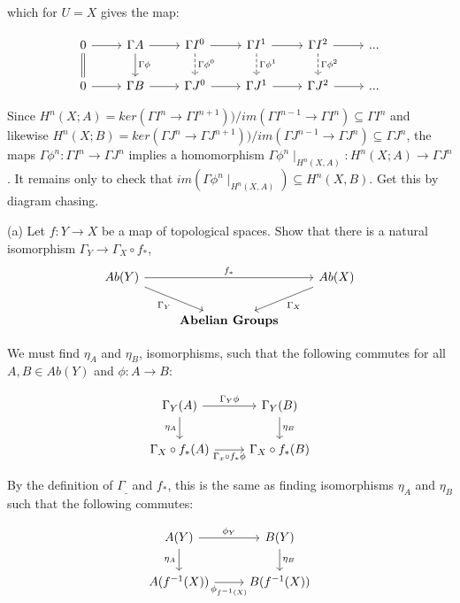 which for $U = X$ gives the map:

\[
\begin{tikzcd}
0 \arrow[r] \arrow[d, equal]
& \Gamma A \arrow[r] \arrow[d, "\Gamma \phi"]
& \Gamma I^0 \arrow[r] \arrow[d, "\Gamma \phi^0", dashed]
& \Gamma I^1 \arrow[r] \arrow[d, "\Gamma \phi^1", dashed]
& \Gamma I^2 \arrow[r] \arrow[d, "\Gamma \phi^2", dashed]
& ...
\\
0 \arrow[r]
& \Gamma B \arrow[r]
& \Gamma J^0 \arrow[r]
& \Gamma J^1 \arrow[r]
& \Gamma J^2 \arrow[r]
& ...
\end{tikzcd}
\]

Since $H^n(X;A) = ker(\Gamma I^n \rightarrow \Gamma I^{n+1})) /im (\Gamma I^{n-1} \rightarrow \Gamma I^n) \subseteq \Gamma I^n$ and likewise $H^n(X;B) = ker(\Gamma J^n \rightarrow \Gamma J^{n+1})) /im (\Gamma J^{n-1} \rightarrow \Gamma J^n) \subseteq \Gamma J^n$, the maps $\Gamma \phi^n: \Gamma I^n \rightarrow \Gamma J^n$ implies a homomorphism $\Gamma \phi^n\mid_{H^n(X,A)}: H^n(X;A) \rightarrow \Gamma J^n$. It remains only to check that $im(\Gamma \phi^n\mid_{H^n(X,A)}) \subseteq H^n(X,B)$. Get this by diagram chasing.

(a) Let $f: Y \rightarrow X$ be a map of topological spaces. Show that there is a natural isomorphism $\Gamma_Y \rightarrow \Gamma_X \circ f_*$, 
\[
\begin{tikzcd}
Ab(Y) \arrow[rr,"f_*"] \arrow[rd, "\Gamma_Y"'] & & Ab(X) \arrow[ld, "\Gamma_X"]\\
& \textbf{Abelian Groups} 
\end{tikzcd}
\]

We must find $\eta_A$ and $\eta_B$,  isomorphisms, such that the following commutes for all $A,B \in Ab(Y)$ and $\phi:A \rightarrow B$: 

\[
\begin{tikzcd}
\Gamma_Y(A) \arrow[r, "\Gamma_Y \phi"] \arrow[d, "\eta_A"']
&  \Gamma_Y(B) \arrow[d, "\eta_B"] \\
\Gamma_X  \circ f_*(A) \arrow[r, "\Gamma_x \circ f_* \phi"']
& \Gamma_X  \circ f_*(B)
\end{tikzcd}
\]

By the definition of $\Gamma_{\_}$ and $f_*$, this is the same as finding isomorphisms $\eta_A$ and $\eta_B$ such that the following commutes:

\[
\begin{tikzcd}
A(Y) \arrow[r, "\phi_Y"] \arrow[d, "\eta_A"']
&  B(Y) \arrow[d, "\eta_B"] \\
A(f^{-1}(X)) \arrow[r, "\phi_{f^{-1}(X)}"']
& B(f^{-1}(X))
\end{tikzcd}
\]

